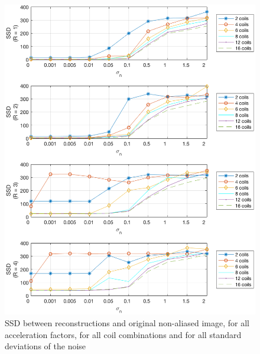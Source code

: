 \begin{figure}[H]
    \centering
    \includegraphics[width=1\textwidth,keepaspectratio]{ssdnoise}
    \caption{SSD between reconstructions and original non-aliased image, for all acceleration factors, for all coil combinations and for all standard deviations of the noise}
    \label{fig:ssdnoise}
\end{figure}


